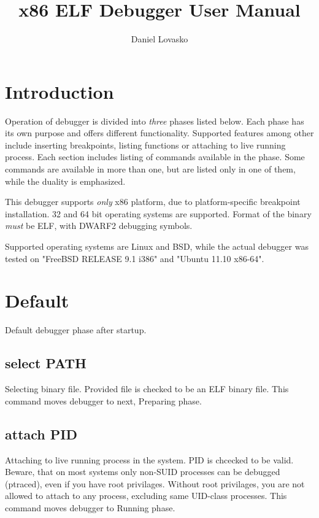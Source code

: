\documentclass{article}
\begin{document}
	\title{x86 ELF Debugger User Manual}
	\author{Daniel Lovasko}
	\date{}
	\maketitle
	
	\section*{Introduction}
   
   Operation of debugger is divided into \emph{three} phases listed below. Each phase has its own purpose and offers different functionality. Supported features among other include inserting breakpoints, listing functions or attaching to live running process. Each section includes listing of commands available in the phase. Some commands are available in more than one, but are listed only in one of them, while the duality is emphasized.
   
   This debugger supports \emph{only} x86 platform, due to platform-specific breakpoint installation. 32 and 64 bit operating systems are supported. Format of the binary \emph{must} be ELF, with DWARF2 debugging symbols.
   
   Supported operating systems are Linux and BSD, while the actual debugger was tested on "FreeBSD RELEASE 9.1 i386" and "Ubuntu 11.10 x86-64". 
   
	\pagebreak   
   
	\section{Default}
	Default debugger phase after startup.
	\subsection{select PATH}
	Selecting binary file. Provided file is checked to be an ELF binary file. This command moves debugger to next, Preparing phase.	
	
	\subsection{attach PID}
	Attaching to live running process in the system. PID is chcecked to be valid. Beware, that on most systems only non-SUID processes can be debugged (ptraced), even if you have root privilages. Without root privilages, you are not allowed to attach to any process, excluding same UID-class processes. This command moves debugger to Running phase.
	
\end{document}

